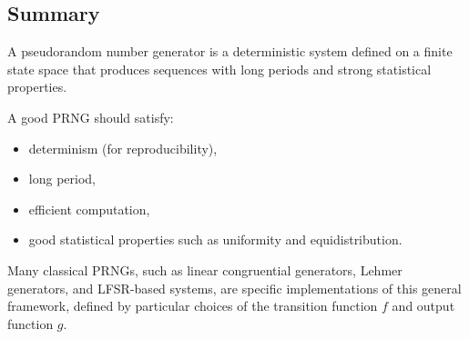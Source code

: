 \subsection{Summary}

A pseudorandom number generator is a deterministic system defined on a finite state space that produces sequences with long periods and strong statistical properties.

A good PRNG should satisfy:
\begin{itemize}
    \item determinism (for reproducibility),
    \item long period,
    \item efficient computation,
    \item good statistical properties such as uniformity and equidistribution.
\end{itemize}

Many classical PRNGs, such as linear congruential generators, Lehmer generators, and LFSR-based systems, are specific implementations of this general framework, defined by particular choices of the transition function $f$ and output function $g$.